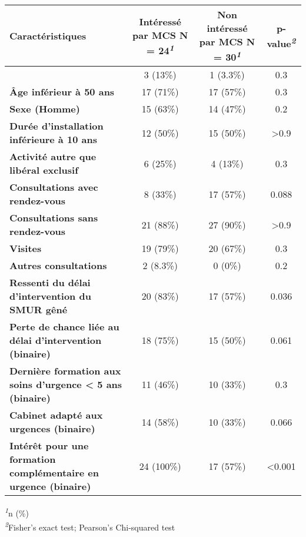 \documentclass[
]{article}
\begin{document}
\begin{table}[t]
\fontsize{12.0pt}{14.4pt}\selectfont
\begin{tabular*}{\linewidth}{@{\extracolsep{\fill}}lccc}
\toprule
\textbf{Caractéristiques} & \textbf{Intéressé par MCS}  N = 24\textsuperscript{\textit{1}} & \textbf{Non intéressé par MCS}  N = 30\textsuperscript{\textit{1}} & \textbf{p-value}\textsuperscript{\textit{2}} \\ 
\midrule\addlinespace[2.5pt]
{\bfseries Connaissance du dispositif MCS} & 3 (13\%) & 1 (3.3\%) & 0.3 \\ 
{\bfseries Âge inférieur à 50 ans} & 17 (71\%) & 17 (57\%) & 0.3 \\ 
{\bfseries Sexe (Homme)} & 15 (63\%) & 14 (47\%) & 0.2 \\ 
{\bfseries Durée d'installation inférieure à 10 ans} & 12 (50\%) & 15 (50\%) & >0.9 \\ 
{\bfseries Activité autre que libéral exclusif} & 6 (25\%) & 4 (13\%) & 0.3 \\ 
{\bfseries Consultations avec rendez-vous} & 8 (33\%) & 17 (57\%) & 0.088 \\ 
{\bfseries Consultations sans rendez-vous} & 21 (88\%) & 27 (90\%) & >0.9 \\ 
{\bfseries Visites} & 19 (79\%) & 20 (67\%) & 0.3 \\ 
{\bfseries Autres consultations} & 2 (8.3\%) & 0 (0\%) & 0.2 \\ 
{\bfseries Ressenti du délai d'intervention du SMUR gêné} & 20 (83\%) & 17 (57\%) & 0.036 \\ 
{\bfseries Perte de chance liée au délai d'intervention (binaire)} & 18 (75\%) & 15 (50\%) & 0.061 \\ 
{\bfseries Dernière formation aux soins d'urgence < 5 ans (binaire)} & 11 (46\%) & 10 (33\%) & 0.3 \\ 
{\bfseries Cabinet adapté aux urgences (binaire)} & 14 (58\%) & 10 (33\%) & 0.066 \\ 
{\bfseries Intérêt pour une formation complémentaire en urgence (binaire)} & 24 (100\%) & 17 (57\%) & <0.001 \\ 
\bottomrule
\end{tabular*}
\begin{minipage}{\linewidth}
\textsuperscript{\textit{1}}n (\%)\\
\textsuperscript{\textit{2}}Fisher's exact test; Pearson's Chi-squared test\\
\end{minipage}
\end{table}
\end{document}
